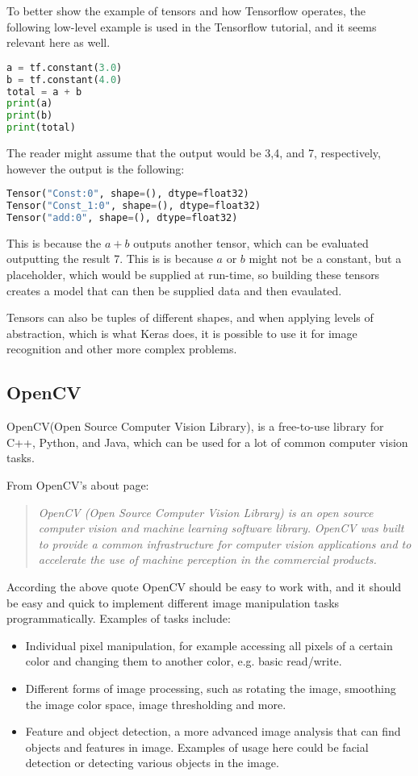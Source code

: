 To better show the example of tensors and how Tensorflow operates, the following low-level example is used in the Tensorflow tutorial, and it seems relevant here as well.

\begin{lstlisting}[language=Python,label=lis:TensorFlowPy1,caption=Example of a Tensorflow program]
a = tf.constant(3.0)
b = tf.constant(4.0)
total = a + b
print(a)
print(b)
print(total)
\end{lstlisting}
The reader might assume that the output would be 3,4, and 7, respectively, however the output is the following:
\begin{lstlisting}[language=Python,label=lis:TensorFlowPy2,caption=Output of example \autoref{lis:TensorFlowPy2}]
Tensor("Const:0", shape=(), dtype=float32)
Tensor("Const_1:0", shape=(), dtype=float32)
Tensor("add:0", shape=(), dtype=float32)
\end{lstlisting}
This is because the $ a + b $ outputs another tensor, which can be evaluated outputting the result 7.
This is is because $a$ or $b$ might not be a constant, but a placeholder, which would be supplied at run-time, so building these tensors creates a model that can then be supplied data and then evaulated.

Tensors can also be tuples of different shapes, and when applying levels of abstraction, which is what Keras does, it is possible to use it for image recognition and other more complex problems.

\subsection{OpenCV}
OpenCV(Open Source Computer Vision Library), is a free-to-use library for C++, Python, and Java, which can be used for a lot of common computer vision tasks\cite{opencv}.

From OpenCV's about page:
\begin{quote}
\textit{OpenCV (Open Source Computer Vision Library) is an open source computer vision and machine learning software library.}
\textit{OpenCV was built to provide a common infrastructure for computer vision applications and to accelerate the use of machine perception in the commercial products\cite{opencvabout}.}
\end{quote}
According the above quote OpenCV should be easy to work with, and it should be easy and quick to implement different image manipulation tasks programmatically.
Examples of tasks include\cite{opencvexamples}:
\begin{itemize}[noitemsep]
	\item Individual pixel manipulation, for example accessing all pixels of a certain color and changing them to another color, e.g. basic read/write.
	\item Different forms of image processing, such as rotating the image, smoothing the image color space, image thresholding and more.
	\item Feature and object detection, a more advanced image analysis that can find objects and features in image. 
	Examples of usage here could be facial detection or detecting various objects in the image.
\end{itemize}

